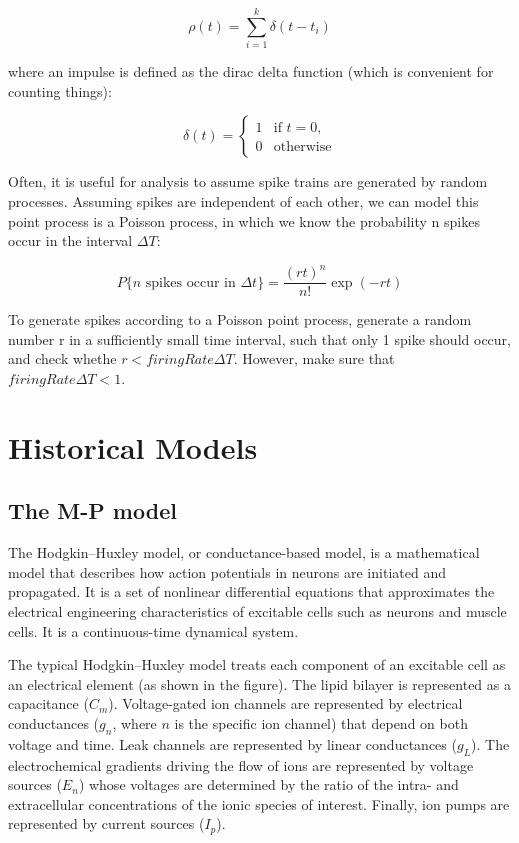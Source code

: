 \documentclass[paper=a4, fontsize=11pt]{scrartcl} %
\numberwithin{equation}{section} %
\numberwithin{figure}{section} %
\numberwithin{table}{section} %
\begin{document}
\begin{equation}
    \rho(t) = \sum_{i=1}^{k} \delta(t-t_i)
\end{equation}

where an impulse is defined as the dirac delta function (which is convenient for counting things):

\begin{equation}
    \delta(t) = \begin{cases} 1 & \text{if } t = 0, \\ 0 & \text{otherwise} \end{cases}
\end{equation}

Often, it is useful for analysis to assume spike trains are generated by random processes. Assuming spikes are independent of each other, we can model this point process is a Poisson process, in which we know the probability n spikes occur in the interval $\Delta T$:

\begin{equation}
    P\{n \text{ spikes occur in } \Delta t\} = \frac{(rt)^n}{n!} \exp(-rt)
\end{equation}

To generate spikes according to a Poisson point process, generate a random number r in a sufficiently small time interval, such that only 1 spike should occur, and check whethe $r < firingRate \Delta T$. However, make sure that $firingRate\Delta T < 1$.






\section{Historical Models}

\subsection{The M-P model}

The Hodgkin–Huxley model, or conductance-based model, is a mathematical model that describes how action potentials in neurons are initiated and propagated. It is a set of nonlinear differential equations that approximates the electrical engineering characteristics of excitable cells such as neurons and muscle cells. It is a continuous-time dynamical system.

\vspace{10pt}
The typical Hodgkin–Huxley model treats each component of an excitable cell as an electrical element (as shown in the figure). The lipid bilayer is represented as a capacitance (\(C_m\)). Voltage-gated ion channels are represented by electrical conductances (\(g_n\), where \(n\) is the specific ion channel) that depend on both voltage and time. Leak channels are represented by linear conductances (\(g_L\)). The electrochemical gradients driving the flow of ions are represented by voltage sources (\(E_n\)) whose voltages are determined by the ratio of the intra- and extracellular concentrations of the ionic species of interest. Finally, ion pumps are represented by current sources (\(I_p\)).
\end{document}
